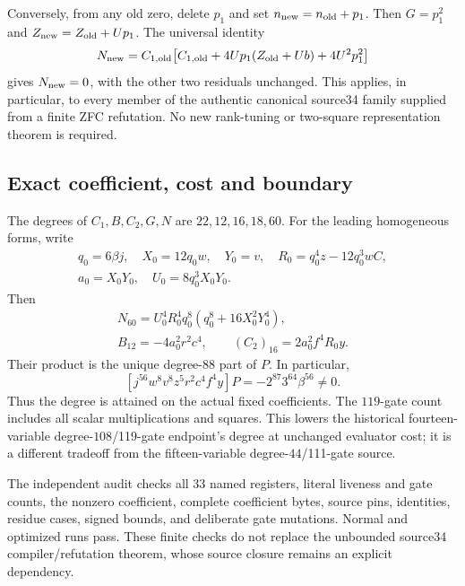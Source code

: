 Conversely, from any old zero, delete $p_1$ and set
$n_{\rm new}=n_{\rm old}+p_1$. Then $G=p_1^2$ and
$Z_{\rm new}=Z_{\rm old}+Up_1$. The universal identity
\[
 N_{\rm new}=C_{1,\rm old}
 \bigl[C_{1,\rm old}+4Up_1(Z_{\rm old}+Ub)+4U^2p_1^2\bigr]
\]
gives $N_{\rm new}=0$, with the other two residuals unchanged.
This applies, in particular, to every member of the authentic canonical source34
family supplied from a finite ZFC refutation. No new rank-tuning or two-square
representation theorem is required.

\subsection{Exact coefficient, cost and boundary}
The degrees of $C_1,B,C_2,G,N$ are $22,12,16,18,60$.
For the leading homogeneous forms, write
\begin{gather*}
 q_0=6\beta j,\quad X_0=12q_0w,\quad Y_0=v,\quad
 R_0=q_0^4z-12q_0^3wC,\\
 a_0=X_0Y_0,\quad U_0=8q_0^3X_0Y_0.
\end{gather*}
Then
\begin{gather*}
 N_{60}=U_0^4R_0^4q_0^8(q_0^8+16X_0^2Y_0^4),\\
 B_{12}=-4a_0^2r^2c^4,\qquad (C_2)_{16}=2a_0^2f^4R_0y.
\end{gather*}
Their product is the unique degree-$88$ part of $P$. In particular,
\[
 [j^{56}w^8v^8z^5r^2c^4f^4y]P
       =-2^{87}3^{64}\beta^{56}\ne0.
\]
Thus the degree is attained on the actual fixed coefficients. The $119$-gate
count includes all scalar multiplications and squares. This lowers the historical
fourteen-variable degree-$108$/119-gate endpoint's degree at unchanged evaluator
cost; it is a different tradeoff from the fifteen-variable degree-$44$/111-gate
source.

The independent audit checks all 33 named registers, literal liveness and gate
counts, the nonzero coefficient, complete coefficient bytes, source pins,
identities, residue cases, signed bounds, and deliberate gate mutations. Normal
and optimized runs pass. These finite checks do not replace the unbounded source34
compiler/refutation theorem, whose source closure remains an explicit dependency.
